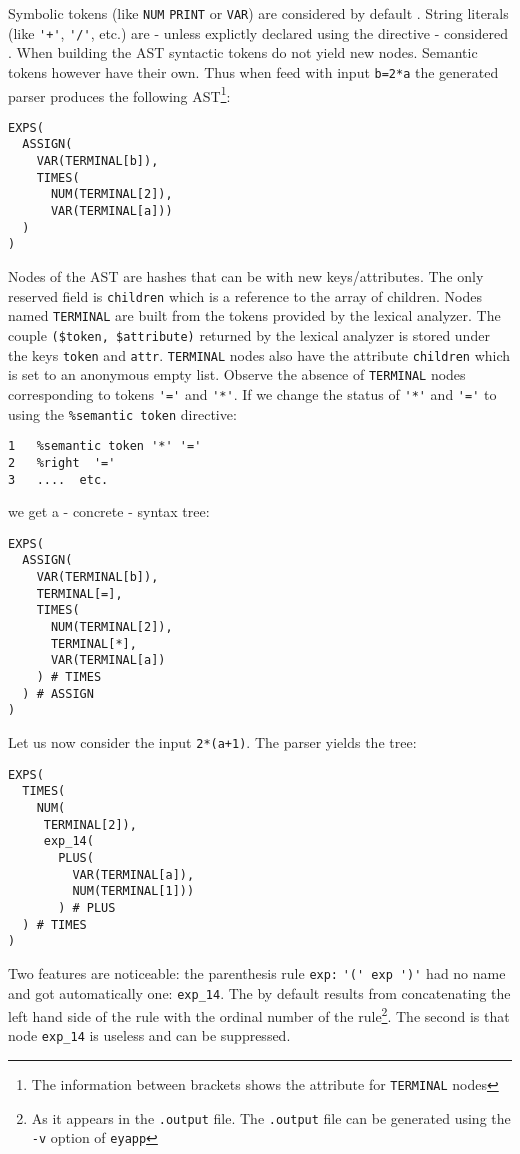 Symbolic tokens (like \verb|NUM|
\verb|PRINT| or \verb|VAR|) 
are considered by default . 
String literals 
(like \verb|'+'|, \verb|'/'|, etc.)
are - unless explictly 
declared using the  directive - 
considered .
When building the AST syntactic tokens do not yield 
new nodes.
Semantic tokens however have their own. Thus
when feed with input \verb|b=2*a| 
the generated parser
produces the following AST\footnote{The information
between brackets shows the attribute 
for {\tt TERMINAL} nodes}:
\begin{verbatim}
EXPS(
  ASSIGN(
    VAR(TERMINAL[b]),
    TIMES(
      NUM(TERMINAL[2]),
      VAR(TERMINAL[a]))
  )
)
\end{verbatim}
Nodes of the AST are hashes that can be 
 with new keys/attributes.
The only reserved field is \verb|children| which is a reference to the
array of children. 
Nodes named \verb|TERMINAL| are built from the
tokens provided by the lexical analyzer. 
The couple \verb|($token, $attribute)| returned by the lexical analyzer
is stored under the keys \verb|token| and \verb|attr|.
\verb|TERMINAL| nodes also have the attribute \verb|children| which is
set to an anonymous empty list.
Observe the absence of \verb|TERMINAL| nodes corresponding to 
tokens \verb|'='| and \verb|'*'|.
If we change the status of \verb|'*'| and \verb|'='| 
to  using the \verb|%semantic token| directive:
\begin{verbatim}
1   %semantic token '*' '='
2   %right  '='
3   ....  etc.
\end{verbatim}
we get a - concrete - syntax tree:
\begin{verbatim}
EXPS(
  ASSIGN(
    VAR(TERMINAL[b]),
    TERMINAL[=],
    TIMES(
      NUM(TERMINAL[2]),
      TERMINAL[*],
      VAR(TERMINAL[a])
    ) # TIMES
  ) # ASSIGN
)
\end{verbatim}
Let us now consider the input \verb|2*(a+1)|.
The parser yields the tree:
\begin{verbatim}
EXPS(
  TIMES(
    NUM(
     TERMINAL[2]),
     exp_14(
       PLUS(
         VAR(TERMINAL[a]),
         NUM(TERMINAL[1]))
       ) # PLUS
  ) # TIMES
)
\end{verbatim}
Two features are noticeable: the parenthesis rule \verb|exp:| \verb|'(' exp ')'|
had no name
and got automatically one: \verb|exp_14|. The  by 
default results from concatenating the left hand side of the rule
with the ordinal number of the rule\footnote{As it appears
in the {\tt .output} file. The {\tt .output} file can be generated 
using the {\tt -v} option of {\tt eyapp}}.
The second is that node \verb|exp_14| is useless and can be suppressed. 

